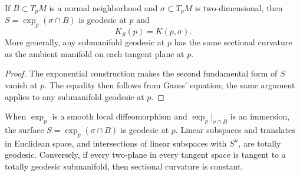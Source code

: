 \begin{remark}
  \label{rem:dc-ch6-2-9-interpretation}
  \leanok
  If $B\subset T_pM$ is a normal neighborhood and $\sigma\subset T_pM$ is
  two-dimensional, then $S=\exp_p(\sigma\cap B)$ is geodesic at $p$ and
  $$
  K_S(p)=K(p,\sigma).
  $$
  More generally, any submanifold geodesic at $p$ has the same sectional
  curvature as the ambient manifold on each tangent plane at $p$.
\end{remark}
\begin{proof}
  \sketch
  The exponential construction makes the second fundamental form of $S$ vanish
  at $p$. The equality then follows from Gauss' equation; the same argument
  applies to any submanifold geodesic at $p$.
\end{proof}

\begin{remark}
  \label{rem:dc-ch6-2-9-exp-surface}
  \notready
  When $\exp_p$ is a smooth local diffeomorphism and
  $\exp_p|_{\sigma\cap B}$ is an immersion, the surface
  $S=\exp_p(\sigma\cap B)$ is geodesic at $p$. Linear subspaces and translates
  in Euclidean space, and intersections of linear subspaces with $S^n$, are
  totally geodesic. Conversely, if every two-plane in every tangent space is
  tangent to a totally geodesic submanifold, then sectional curvature is
  constant.
\end{remark}

